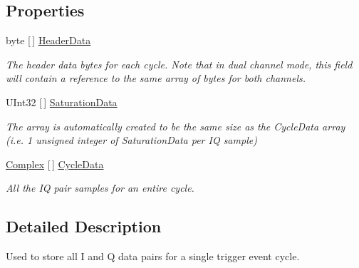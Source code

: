\subsection*{Properties}
\begin{DoxyCompactItemize}
\item 
byte \mbox{[}$\,$\mbox{]} \mbox{\hyperlink{class_c_s_i_1_1_library_1_1_signal_processing_1_1_r_f_1_1_i_q___processing_1_1_i_q___data___one_cycle_a0b37eff5fd1a2ca0514eefd346382919}{Header\+Data}}
\begin{DoxyCompactList}\small\item\em The header data bytes for each cycle. Note that in dual channel mode, this field will contain a reference to the same array of bytes for both channels. \end{DoxyCompactList}\item 
U\+Int32 \mbox{[}$\,$\mbox{]} \mbox{\hyperlink{class_c_s_i_1_1_library_1_1_signal_processing_1_1_r_f_1_1_i_q___processing_1_1_i_q___data___one_cycle_a6d2ecf52fd4a9c8eafef3fbbe28af9a2}{Saturation\+Data}}
\begin{DoxyCompactList}\small\item\em The array is automatically created to be the same size as the Cycle\+Data array (i.\+e. 1 unsigned integer of Saturation\+Data per IQ sample) \end{DoxyCompactList}\item 
\mbox{\hyperlink{struct_c_s_i_1_1_library_1_1_data_types_1_1_complex}{Complex}} \mbox{[}$\,$\mbox{]} \mbox{\hyperlink{class_c_s_i_1_1_library_1_1_signal_processing_1_1_r_f_1_1_i_q___processing_1_1_i_q___data___one_cycle_a45efa0f141ad9702930f9f845e87fd81}{Cycle\+Data}}
\begin{DoxyCompactList}\small\item\em All the IQ pair samples for an entire cycle. \end{DoxyCompactList}\end{DoxyCompactItemize}


\subsection{Detailed Description}
Used to store all I and Q data pairs for a single trigger event cycle. 



